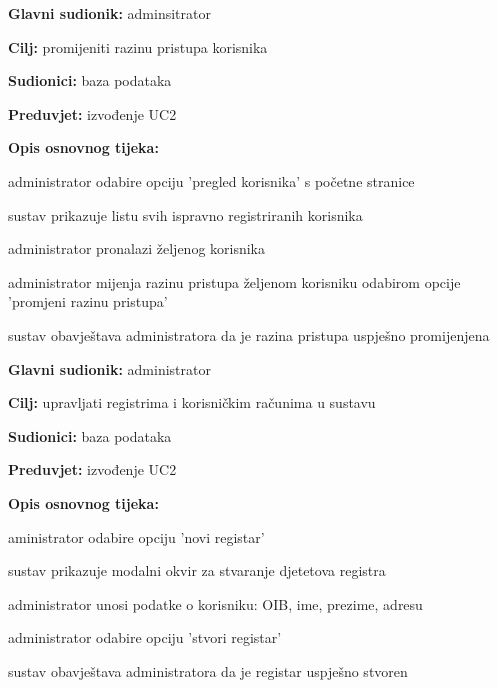                     \noindent {}
					\begin{packed_item}
	
						\item \textbf{Glavni sudionik: }adminsitrator
						\item  \textbf{Cilj:} promijeniti razinu pristupa korisnika
						\item  \textbf{Sudionici:} baza podataka
						\item  \textbf{Preduvjet:} izvođenje UC2
						\item  \textbf{Opis osnovnog tijeka:}
						
						\item[] \begin{packed_enum}
							\item administrator odabire opciju 'pregled korisnika' s početne stranice
							\item sustav prikazuje listu svih ispravno registriranih korisnika
							\item administrator pronalazi željenog korisnika
							\item administrator mijenja razinu pristupa željenom korisniku odabirom opcije 'promjeni razinu pristupa'
							\item sustav obavještava administratora da je razina pristupa uspješno promijenjena
                        
						\end{packed_enum}
					\end{packed_item}
        
                    \noindent {}
					\begin{packed_item}
	
						\item \textbf{Glavni sudionik: }administrator
						\item  \textbf{Cilj:} upravljati registrima i korisničkim računima u sustavu
						\item  \textbf{Sudionici:} baza podataka
						\item  \textbf{Preduvjet:} izvođenje UC2
						\item  \textbf{Opis osnovnog tijeka:}
						
						\item[] \begin{packed_enum}
	
							\item aministrator odabire opciju 'novi registar'
							\item sustav prikazuje modalni okvir za stvaranje djetetova registra
							\item administrator unosi podatke o korisniku: OIB, ime, prezime, adresu
							\item administrator odabire opciju 'stvori registar'
							\item sustav obavještava administratora da je registar uspješno stvoren

						\end{packed_enum}
						
					\end{packed_item}

